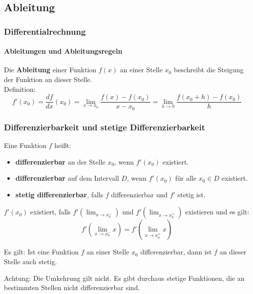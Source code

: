 \documentclass{beamer}
\begin{document}
\subsection{Ableitung}
\begin{frame}
  \frametitle{Differentialrechnung}
  \framesubtitle{Ableitungen und Ableitungsregeln}


Die \textbf{Ableitung} einer Funktion $f(x)$ an einer Stelle $x_0$ beschreibt die Steigung der Funktion an dieser Stelle.\\

Definition: $$f'(x_0)=\frac{df}{dx}(x_0)=\lim_{x \to x_0} \frac{f(x)-f(x_0)}{x - x_0}=\lim_{h \to 0}\frac{f(x_0+h)-f(x_0)}{h}$$
\begin{center}
\end{center}   
\end{frame}

\begin{frame}
  \frametitle{Differenzierbarkeit und stetige Differenzierbarkeit}
  Eine Funktion $f$ heißt:
  \begin{itemize}
    \item \textbf{differenzierbar} an der Stelle $x_0$, wenn $f'(x_0)$ existiert.
    \item \textbf{differenzierbar} auf dem Intervall $D$, wenn $f'(x_0)$ für alle $x_0 \in D$ existiert.
    \item \textbf{stetig differenzierbar}, falls $f$ differenzierbar und $f'$ stetig ist.
  \end{itemize}
 
  \vspace{1em}

  $f'(x_0)$ existiert, falls $f'(\lim_{x\to x_0^-})$ und $f'(\lim_{x\to x_0^+})$ existieren und es gilt:
  $$f'(\lim_{x\to x_0^-}x) = f'(\lim_{x\to x_0^+}x)$$
\end{frame}

\begin{frame}
  Es gilt: Ist eine Funktion $f$ an einer Stelle $x_0$ differenzierbar, dann ist $f$ an dieser Stelle auch stetig.

  \vspace{1em}

  Achtung: Die Umkehrung gilt nicht. Es gibt durchaus stetige Funktionen, die an bestimmten Stellen nicht differenzierbar sind.

\end{frame}
\end{document}
